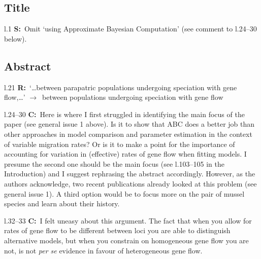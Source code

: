 \documentclass[11pt]{article}
\newenvironment{my_description}
{\begin{description}
  \setlength{\itemsep}{2pt}
  \setlength{\parskip}{0pt}
  \setlength{\parsep}{0pt}}
{\end{description}}
\newcommand{\ra}{$\rightarrow$\ }
\newcommand{\C}{\textbf{C:}\ }
\newcommand{\R}{\textbf{R:}\ }
\newcommand{\V}{\textbf{S:}\ }
\begin{document}
\subsection{Title}

\begin{my_description}
	\item[l.1] \V Omit `using Approximate Bayesian Computation' (see comment to l.24--30 below).
\end{my_description}

\subsection{Abstract}

\begin{my_description}
	\item[l.21] \R `\dots between parapatric populations undergoing speciation with gene flow,\dots' \ra between populations undergoing speciation with gene flow
	\item[l.24--30] \C Here is where I first struggled in identifying the main focus of the paper (see general issue 1 above). Is it to show that ABC does a better job than other approaches in model comparison and parameter estimation in the context of variable migration rates? Or is it to make a point for the importance of accounting for variation in (effective) rates of gene flow when fitting models. I presume the second one should be the main focus (see l.103--105 in the Introduction) and I suggest rephrasing the abstract accordingly. However, as the authors acknowledge, two recent publications already looked at this problem (see general issue 1). A third option would be to focus more on the pair of mussel species and learn about their history.
	\item[l.32--33] \C I felt uneasy about this argument. The fact that when you allow for rates of gene flow to be different between loci you are able to distinguish alternative models, but when you constrain on homogeneous gene flow you are not, is not \emph{per se} evidence in favour of heterogeneous gene flow.
\end{my_description}
\end{document}
